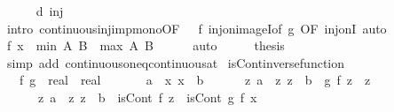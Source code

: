 \begin{isabellebody}
\ \ \ \ \isamarkupfalse%
\ d\ inj\ \isamarkupfalse%
\ {\isacharparenleft}{\kern0pt}intro\ continuous{\isacharunderscore}{\kern0pt}inj{\isacharunderscore}{\kern0pt}imp{\isacharunderscore}{\kern0pt}mono{\isacharbrackleft}{\kern0pt}OF\ {\isacharunderscore}{\kern0pt}\ {\isacharunderscore}{\kern0pt}\ f{\isacharbrackright}{\kern0pt}\ inj{\isacharunderscore}{\kern0pt}on{\isacharunderscore}{\kern0pt}imageI{}{\isacharbrackleft}{\kern0pt}of\ g{\isacharcomma}{\kern0pt}\ OF\ inj{\isacharunderscore}{\kern0pt}onI{\isacharbrackright}{\kern0pt}{\isacharparenright}{\kern0pt}\ auto\isanewline
\ \ \isamarkupfalse%
\ \isamarkupfalse%
\ {\isachardoublequoteopen}f\ x\ {\isasymin}\ {\isacharbraceleft}{\kern0pt}min\ {\isacharquery}{\kern0pt}A\ {\isacharquery}{\kern0pt}B\ {\isacharless}{\kern0pt}{\isachardot}{\kern0pt}{\isachardot}{\kern0pt}{\isacharless}{\kern0pt}\ max\ {\isacharquery}{\kern0pt}A\ {\isacharquery}{\kern0pt}B{\isacharbraceright}{\kern0pt}{\isachardoublequoteclose}\isanewline
\ \ \ \ \isamarkupfalse%
\ auto\isanewline
\ \ \isamarkupfalse%
\ \isamarkupfalse%
\ {\isacharquery}{\kern0pt}thesis\isanewline
\ \ \ \ \isamarkupfalse%
\ {\isacharparenleft}{\kern0pt}simp\ add{\isacharcolon}{\kern0pt}\ continuous{\isacharunderscore}{\kern0pt}on{\isacharunderscore}{\kern0pt}eq{\isacharunderscore}{\kern0pt}continuous{\isacharunderscore}{\kern0pt}at{\isacharparenright}{\kern0pt}\isanewline
{}\isamarkupfalse%
%
\endisatagproof
{\isafoldproof}%
%
\isadelimproof
\isanewline
%
\endisadelimproof
\isanewline
{}\isamarkupfalse%
\ isCont{\isacharunderscore}{\kern0pt}inverse{\isacharunderscore}{\kern0pt}function{}{\isacharcolon}{\kern0pt}\isanewline
\ \ \ f\ g\ {\isacharcolon}{\kern0pt}{\isacharcolon}{\kern0pt}\ {\isachardoublequoteopen}real\ {\isasymRightarrow}\ real{\isachardoublequoteclose}\isanewline
\ \ \isanewline
\ \ \ \ {\isachardoublequoteopen}{\isasymlbrakk}a\ {\isacharless}{\kern0pt}\ x{\isacharsemicolon}{\kern0pt}\ x\ {\isacharless}{\kern0pt}\ b{\isacharsemicolon}{\kern0pt}\isanewline
\ \ \ \ \ \ {\isasymAnd}z{\isachardot}{\kern0pt}\ {\isasymlbrakk}a\ {\isasymle}\ z{\isacharsemicolon}{\kern0pt}\ z\ {\isasymle}\ b{\isasymrbrakk}\ {\isasymLongrightarrow}\ g\ {\isacharparenleft}{\kern0pt}f\ z{\isacharparenright}{\kern0pt}\ {\isacharequal}{\kern0pt}\ z{\isacharsemicolon}{\kern0pt}\isanewline
\ \ \ \ \ \ {\isasymAnd}z{\isachardot}{\kern0pt}\ {\isasymlbrakk}a\ {\isasymle}\ z{\isacharsemicolon}{\kern0pt}\ z\ {\isasymle}\ b{\isasymrbrakk}\ {\isasymLongrightarrow}\ isCont\ f\ z{\isasymrbrakk}\ {\isasymLongrightarrow}\ isCont\ g\ {\isacharparenleft}{\kern0pt}f\ x{\isacharparenright}{\kern0pt}{\isachardoublequoteclose}\isanewline

\end{isabellebody}
